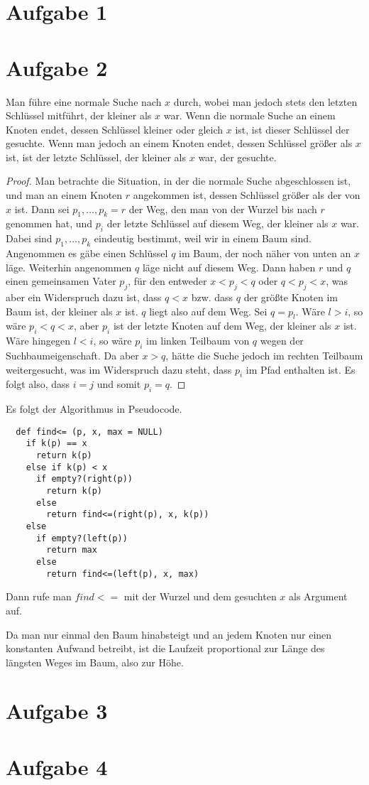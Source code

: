 \documentclass[10pt,a4paper]{article}
\begin{document}
\section{Aufgabe 1}

\section{Aufgabe 2}
Man führe eine normale Suche nach $x$ durch, wobei man jedoch stets den letzten Schlüssel mitführt, der kleiner als $x$ war.
Wenn die normale Suche an einem Knoten endet, dessen Schlüssel kleiner oder gleich $x$ ist, ist dieser Schlüssel der gesuchte.
Wenn man jedoch an einem Knoten endet, dessen Schlüssel größer als $x$ ist, ist der letzte Schlüssel, der kleiner als $x$ war, der gesuchte.
\begin{proof}
  Man betrachte die Situation, in der die normale Suche abgeschlossen ist, und man an einem Knoten $r$ angekommen ist, dessen Schlüssel größer als der von $x$ ist.
  Dann sei $p_{1}, \dots, p_{k} = r$ der Weg, den man von der Wurzel bis nach $r$ genommen hat, und $p_{i}$ der letzte Schlüssel auf diesem Weg, der kleiner als $x$ war.
  Dabei sind $p_{1}, \dots, p_{k}$ eindeutig bestimmt, weil wir in einem Baum sind.
  Angenommen es gäbe einen Schlüssel $q$ im Baum, der noch näher von unten an $x$ läge.
  Weiterhin angenommen $q$ läge nicht auf diesem Weg.
  Dann haben $r$ und $q$ einen gemeinsamen Vater $p_{j}$, für den entweder $x < p_{j} < q$ oder $q < p_{j} < x$, was aber ein Widerspruch dazu ist, dass $q < x$ bzw. dass $q$ der größte Knoten im Baum ist, der kleiner als $x$ ist.
  $q$ liegt also auf dem Weg.
  Sei $q = p_{l}$.
  Wäre $l > i$, so wäre $p_{i} < q < x$, aber $p_{i}$ ist der letzte Knoten auf dem Weg, der kleiner als $x$ ist.
  Wäre hingegen $l < i$, so wäre $p_{i}$ im linken Teilbaum von $q$ wegen der Suchbaumeigenschaft.
  Da aber $x > q$, hätte die Suche jedoch im rechten Teilbaum weitergesucht, was im Widerspruch dazu steht, dass $p_{i}$ im Pfad enthalten ist.
  Es folgt also, dass $i = j$ und somit $p_{i} = q$.
\end{proof}
Es folgt der Algorithmus in Pseudocode.
\begin{lstlisting}
  def find<= (p, x, max = NULL)
    if k(p) == x
      return k(p)
    else if k(p) < x
      if empty?(right(p))
        return k(p)
      else
        return find<=(right(p), x, k(p))
    else
      if empty?(left(p))
        return max
      else
        return find<=(left(p), x, max)
\end{lstlisting}
Dann rufe man $find<=$ mit der Wurzel und dem gesuchten $x$ als Argument auf.

Da man nur einmal den Baum hinabsteigt und an jedem Knoten nur einen konstanten Aufwand betreibt, ist die Laufzeit proportional zur Länge des längsten Weges im Baum, also zur Höhe.

\section{Aufgabe 3}

\section{Aufgabe 4}
\end{document}
